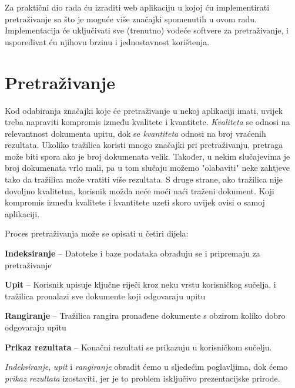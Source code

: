 \documentclass[a4paper,twoside,12pt]{scrreprt}
\begin{document}
Za praktični dio rada ću izraditi web aplikaciju u kojoj ću implementirati pretraživanje sa što je moguće više značajki spomenutih u ovom radu. Implementacija će uključivati sve (trenutno) vodeće softvere za pretraživanje, i uspoređivat ću njihovu brzinu i jednostavnost korištenja.

\chapter{Pretraživanje}


Kod odabiranja značajki koje će pretraživanje u nekoj aplikaciji imati, uvijek treba napraviti kompromis između kvalitete i kvantitete. \textit{Kvaliteta} se odnosi na relevantnost dokumenta upitu, dok se \textit{kvantiteta} odnosi na broj vraćenih rezultata. Ukoliko tražilica koristi mnogo značajki pri pretraživanju, pretraga može biti spora ako je broj dokumenata velik. Također, u nekim slučajevima je broj dokumenata vrlo mali, pa u tom slučaju možemo "olabaviti" neke zahtjeve tako da tražilica može vratiti više rezultata. S druge strane, ako tražilica nije dovoljno kvalitetna, korisnik možda neće moći naći traženi dokument. Koji kompromis između kvalitete i kvantitete uzeti skoro uvijek ovisi o samoj aplikaciji.

Proces pretraživanja može se opisati u četiri dijela:


\begin{compactenum}
  \item \textbf{Indeksiranje} – Datoteke i baze podataka obrađuju se i pripremaju za pretraživanje
  \item \textbf{Upit} – Korisnik upisuje ključne riječi kroz neku vrstu korisničkog sučelja, i tražilica pronalazi sve dokumente koji odgovaraju upitu
  \item \textbf{Rangiranje} – Tražilica rangira pronađene dokumente s obzirom koliko dobro odgovaraju upitu
  \item \textbf{Prikaz rezultata} – Konačni rezultati se prikazuju u korisničkom sučelju.
\end{compactenum}

\textit{Indeksiranje}, \textit{upit} i \textit{rangiranje} obradit ćemo u sljedećim poglavljima, dok ćemo \textit{prikaz rezultata} izostaviti, jer je to problem isključivo prezentacijske prirode.
\end{document}
